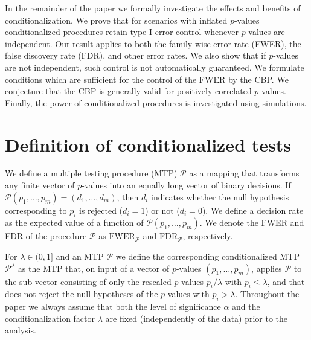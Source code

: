 \documentclass {imsart}
\newcommand{\FWER}{\text{$\mathrm{FWER}$}}
\newcommand{\FDR}{\mathrm{FDR}}
\renewcommand{\P}{\mathcal{P}}
\newcommand{\Plam}{\mathcal{P}^\lambda}
\begin{document}
In the remainder of the paper we formally investigate the effects and benefits of conditionalization. We prove that for scenarios with inflated $p$-values conditionalized procedures retain type I error control whenever $p$-values are independent. Our result applies to both the family-wise error rate (FWER), the false discovery rate (FDR), and other error rates. We also show that if $p$-values are not independent, such control is not automatically guaranteed. We formulate conditions which are sufficient for the control of the FWER by the CBP. We conjecture that the CBP is generally valid for positively correlated $p$-values. Finally, the power of conditionalized procedures is investigated using simulations.




\section{Definition of conditionalized tests}

We define a multiple testing procedure (MTP) $\P$ as a mapping that transforms any finite vector of $p$-values into an equally long vector of binary decisions. If $\P({p_1},\ldots,{p_m})=({d_1},\ldots,{d_m})$, then ${d_i}$ indicates whether the null hypothesis corresponding to $p_i$ is rejected ($d_i=1$) or not ($d_i=0$). We define a decision rate as the expected value of a function of $\P({p_1},\ldots,{p_m})$. We denote the FWER and FDR of the procedure $\P$ as $\FWER_{\P}$ and $\FDR_{\P}$, respectively. 


For $\lambda\in(0,1]$ and an MTP $\P$ we define the corresponding conditionalized MTP $\Plam$ as the MTP that, on input of a vector of $p$-values $({p_1},\ldots,{p_m})$,  applies $\P$ to the sub-vector consisting of only the rescaled $p$-values $p_i/\lambda$ with $p_i\leq\lambda$, and that does not reject the null hypotheses of the $p$-values with $p_i > \lambda$. Throughout the paper we always assume that both the level of significance $\alpha$ and the conditionalization factor $\lambda$ are fixed (independently of the data) prior to the analysis.
\end{document}
